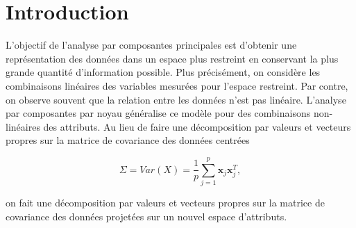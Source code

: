 \section{Introduction}

L'objectif de l'analyse par composantes principales est d'obtenir une représentation des données dans un espace plus restreint en conservant la plus grande quantité d'information possible. Plus précisément, on considère les combinaisons linéaires des variables mesurées pour l'espace restreint. Par contre, on observe souvent que la relation entre les données n'est pas linéaire. L'analyse par composantes par noyau généralise ce modèle pour des combinaisons non-linéaires des attributs. Au lieu de faire une décomposition par valeurs et vecteurs propres sur la matrice de covariance des données centrées

$$\Sigma = Var(X) = \frac{1}{p} \sum_{j = 1}^{p}   \textbf{x}_j\textbf{x}_j^{T},$$

on fait une décomposition par valeurs et vecteurs propres sur la matrice de covariance des données projetées sur un nouvel espace d'attributs.

